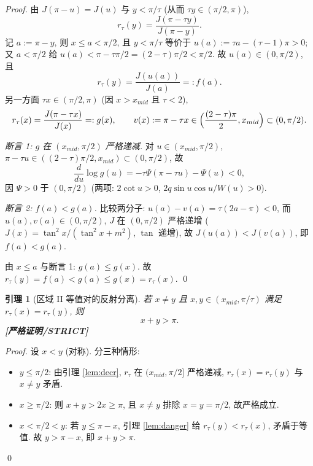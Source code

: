 \documentclass[UTF8]{ctexart}
\newtheorem{lemma}[theorem]{引理}
\newcommand{\STRICT}{\textbf{[严格证明/STRICT]}}
\begin{document}
\begin{proof}
	由 $J(\pi-u)=J(u)$ 与 $y<\pi/\tau$ (从而 $\tau y\in(\pi/2,\pi)$),
	\begin{equation}
		r_\tau(y)=\frac{J(\pi-\tau y)}{J(\pi-y)}.
	\end{equation}
	记 $a:=\pi-y$, 则 $x\le a<\pi/2$, 且 $y<\pi/\tau$ 等价于
	$u(a):=\tau a-(\tau-1)\pi>0$; 又 $a<\pi/2$ 给 $u(a)<\pi-\tau\pi/2=(2-\tau)\pi/2<\pi/2$.
	故 $u(a)\in(0,\pi/2)$, 且
	\begin{equation}
		r_\tau(y)=\frac{J(u(a))}{J(a)}=:f(a).
	\end{equation}
	另一方面 $\tau x\in(\pi/2,\pi)$ (因 $x>x_{mid}$ 且 $\tau<2$),
	\begin{equation}
		r_\tau(x)=\frac{J(\pi-\tau x)}{J(x)}=:g(x),\qquad
		v(x):=\pi-\tau x\in\Bigl(\frac{(2-\tau)\pi}2,x_{mid}\Bigr)\subset(0,\pi/2).
	\end{equation}

	\emph{断言 1: $g$ 在 $(x_{mid},\pi/2)$ 严格递减.} 对
	$u\in(x_{mid},\pi/2)$, $\pi-\tau u\in((2-\tau)\pi/2,x_{mid})\subset(0,\pi/2)$,
	故
	\begin{equation}
		\frac{d}{du}\log g(u)=-\tau\Psi(\pi-\tau u)-\Psi(u)<0,
	\end{equation}
	因 $\Psi>0$ 于 $(0,\pi/2)$ (两项: $2\cot u>0$, $2q\sin u\cos u/W(u)>0$).

	\emph{断言 2: $f(a)<g(a)$.} 比较两分子: $u(a)-v(a)=\tau(2a-\pi)<0$,
	而 $u(a),v(a)\in(0,\pi/2)$, $J$ 在 $(0,\pi/2)$ 严格递增
	($J(x)=\tan^2x/(\tan^2x+m^2)$, $\tan$ 递增), 故
	$J(u(a))<J(v(a))$, 即 $f(a)<g(a)$.

	由 $x\le a$ 与断言 1: $g(a)\le g(x)$. 故
	$r_\tau(y)=f(a)<g(a)\le g(x)=r_\tau(x)$. \qed
\end{proof}

\begin{lemma}[区域 II 等值对的反射分离]\label{lem:Bprime}
	若 $x\ne y$ 且 $x,y\in(x_{mid},\pi/\tau)$ 满足 $r_\tau(x)=r_\tau(y)$, 则
	\begin{equation}
		x+y>\pi.
		\label{eq:xypi}
	\end{equation}
	\STRICT{}
\end{lemma}

\begin{proof}
	设 $x<y$ (对称). 分三种情形:
	\begin{itemize}
		\item $y\le\pi/2$: 由引理 \ref{lem:decr}, $r_\tau$ 在 $(x_{mid},\pi/2]$
			严格递减, $r_\tau(x)=r_\tau(y)$ 与 $x\ne y$ 矛盾.
		\item $x\ge\pi/2$: 则 $x+y>2x\ge\pi$, 且 $x\ne y$ 排除 $x=y=\pi/2$,
			故严格成立.
		\item $x<\pi/2<y$: 若 $y\le\pi-x$, 引理 \ref{lem:danger} 给
			$r_\tau(y)<r_\tau(x)$, 矛盾于等值. 故 $y>\pi-x$, 即
			$x+y>\pi$.
	\end{itemize}
	\qed
\end{proof}
\end{document}
